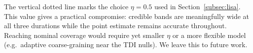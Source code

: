 \documentclass[%
	reprint,
	nofootinbib,
	amsmath,
	amssymb,
	aps,
]{revtex4-2}
\begin{document}
	The vertical dotted line marks the choice $\eta=0.5$ used in
	Section~\ref{subsec:lisa}. This value gives a practical
	compromise: credible bands are meaningfully wide at all three
	durations while the point estimate remains accurate throughout.
	Reaching nominal coverage would require yet smaller $\eta$ or a
	more flexible model (e.g.\ adaptive coarse-graining near the TDI
	nulls). We leave this to future work.


\end{document}
